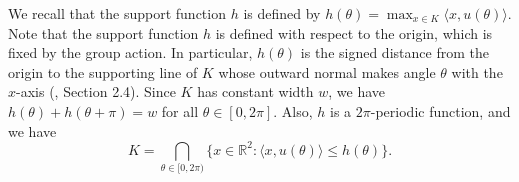 \documentclass[11pt,letterpaper,reqno]{amsart}
\newcommand{\inner}[2]{\langle #1,#2\rangle}
\begin{document}
We recall that the support function $h$ is defined by $h(\theta)=\max_{x\in K}\inner{x}{u(\theta)}$.
Note that the support function $h$ is defined with respect to the origin, which is fixed by the group action. In particular, 
$h(\theta)$ is the signed distance from the origin to the supporting line of $K$ whose outward normal makes angle $\theta$ with the $x$-axis (\cite{Schneider2014}, Section 2.4).
Since $K$ has constant width $w$, we have
$
h(\theta)+h(\theta+\pi)=w
$
for all $\theta \in [0, 2\pi]$.
Also, $h$ is a $2\pi$-periodic function, and we have
\[
K = \bigcap_{\theta \in [0,2\pi)} \{ x \in \mathbb{R}^2 : \langle x, u(\theta) \rangle \le h(\theta) \}.
\]

\end{document}
